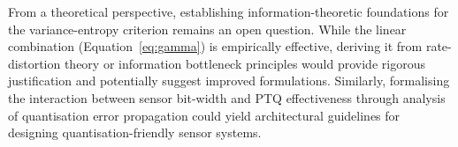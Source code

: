 From a theoretical perspective, establishing information-theoretic foundations for the variance-entropy criterion remains an open question. While the linear combination (Equation~\ref{eq:gamma}) is empirically effective, deriving it from rate-distortion theory or information bottleneck principles would provide rigorous justification and potentially suggest improved formulations. Similarly, formalising the interaction between sensor bit-width and PTQ effectiveness through analysis of quantisation error propagation could yield architectural guidelines for designing quantisation-friendly sensor systems.

